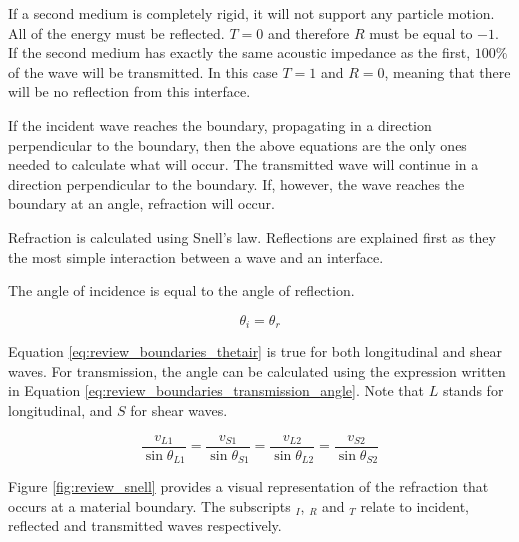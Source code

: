 If a second medium is completely rigid, it will not support any particle motion. All of the energy must be reflected. $T=0$ and therefore $R$ must be equal to $-1$. If the second medium has exactly the same acoustic impedance as the first, $100\%$ of the wave will be transmitted. In this case $T=1$ and $R=0$, meaning that there will be no reflection from this interface.

If the incident wave reaches the boundary, propagating in a direction perpendicular to the boundary, then the above equations are the only ones needed to calculate what will occur. The transmitted wave will continue in a direction perpendicular to the boundary. If, however, the wave reaches the boundary at an angle, refraction will occur.

Refraction is calculated using Snell's law\cite{kuhnicke_limitations_1999}. Reflections are explained first as they the most simple interaction between a wave and an interface.

The angle of incidence is equal to the angle of reflection.

\begin{equation} \label{eq:review_boundaries_thetair}
\theta_{i} = \theta_{r}
\end{equation}

Equation \ref{eq:review_boundaries_thetair} is true for both longitudinal and shear waves. For transmission, the angle can be calculated using the expression written in Equation \ref{eq:review_boundaries_transmission_angle}. Note that $L$ stands for longitudinal, and $S$ for shear waves.

\begin{equation} \label{eq:review_boundaries_transmission_angle}
\frac{v_{L1}}{\sin\theta_{L1}} = \frac{v_{S1}}{\sin\theta_{S1}} = \frac{v_{L2}}{\sin\theta_{L2}} = \frac{v_{S2}}{\sin\theta_{S2}}
\end{equation}

Figure \ref{fig:review_snell} provides a visual representation of the refraction that occurs at a material boundary. The subscripts $_I$, $_R$ and $_T$ relate to incident, reflected and transmitted waves respectively. 

